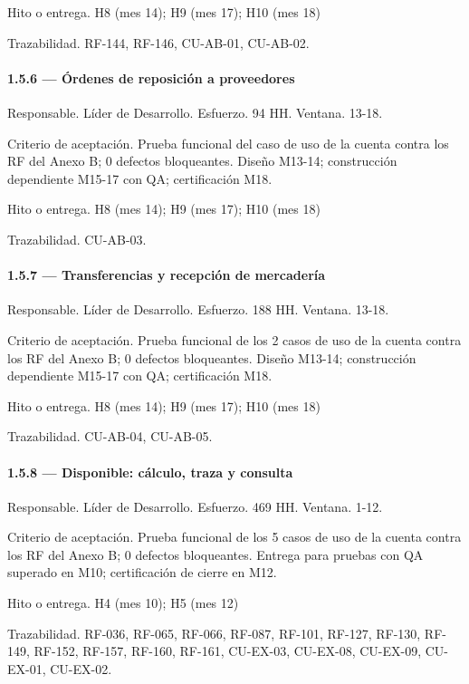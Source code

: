 \documentclass[11pt]{article}
\begin{document}
Hito o entrega. H8 (mes 14); H9 (mes 17); H10 (mes 18)

Trazabilidad. RF-144, RF-146, CU-AB-01, CU-AB-02.

\paragraph{1.5.6 — Órdenes de reposición a proveedores}

Responsable. Líder de Desarrollo. Esfuerzo. 94 HH. Ventana. 13-18.

Criterio de aceptación. Prueba funcional del caso de uso de la cuenta contra los RF del Anexo B; 0 defectos bloqueantes. Diseño M13-14; construcción dependiente M15-17 con QA; certificación M18.

Hito o entrega. H8 (mes 14); H9 (mes 17); H10 (mes 18)

Trazabilidad. CU-AB-03.

\paragraph{1.5.7 — Transferencias y recepción de mercadería}

Responsable. Líder de Desarrollo. Esfuerzo. 188 HH. Ventana. 13-18.

Criterio de aceptación. Prueba funcional de los 2 casos de uso de la cuenta contra los RF del Anexo B; 0 defectos bloqueantes. Diseño M13-14; construcción dependiente M15-17 con QA; certificación M18.

Hito o entrega. H8 (mes 14); H9 (mes 17); H10 (mes 18)

Trazabilidad. CU-AB-04, CU-AB-05.

\paragraph{1.5.8 — Disponible: cálculo, traza y consulta}

Responsable. Líder de Desarrollo. Esfuerzo. 469 HH. Ventana. 1-12.

Criterio de aceptación. Prueba funcional de los 5 casos de uso de la cuenta contra los RF del Anexo B; 0 defectos bloqueantes. Entrega para pruebas con QA superado en M10; certificación de cierre en M12.

Hito o entrega. H4 (mes 10); H5 (mes 12)

Trazabilidad. RF-036, RF-065, RF-066, RF-087, RF-101, RF-127, RF-130, RF-149, RF-152, RF-157, RF-160, RF-161, CU-EX-03, CU-EX-08, CU-EX-09, CU-EX-01, CU-EX-02.
\end{document}
